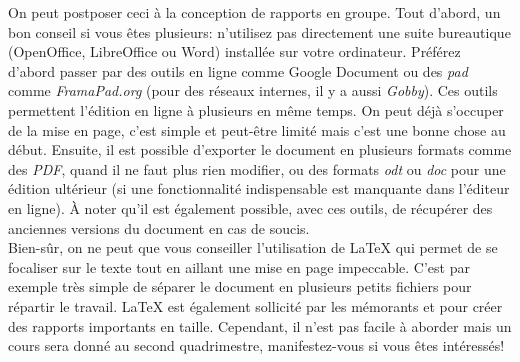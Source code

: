 On peut postposer ceci à la conception de rapports en groupe. Tout d'abord, un bon conseil si vous êtes plusieurs: n'utilisez pas directement une suite bureautique (OpenOffice, LibreOffice ou Word) installée sur votre ordinateur. Préférez d'abord passer par des outils en ligne comme Google Document ou des \textit{pad} comme \textit{FramaPad.org} (pour des réseaux internes, il y a aussi \textit{Gobby}). Ces outils permettent l'édition en ligne à plusieurs en même temps. On peut déjà s'occuper de la mise en page, c'est simple et peut-être limité mais c'est une bonne chose au début. Ensuite, il est possible d'exporter le document en plusieurs formats comme des \textit{PDF}, quand il ne faut plus rien modifier, ou des formats \textit{odt} ou \textit{doc} pour une édition ultérieur (si une fonctionnalité indispensable est manquante dans l'éditeur en ligne). À noter qu'il est également possible, avec ces outils, de récupérer des anciennes versions du document en cas de soucis.\\
Bien-sûr, on ne peut que vous conseiller l'utilisation de \LaTeX{} qui permet de se focaliser sur le texte tout en aillant une mise en page impeccable. C'est par exemple très simple de séparer le document en plusieurs petits fichiers pour répartir le travail. \LaTeX{} est également sollicité par les mémorants et pour créer des rapports importants en taille. Cependant, il n'est pas facile à aborder mais un cours sera donné au second quadrimestre, manifestez-vous si vous êtes intéressés!
                                                                                                                   

	
	
